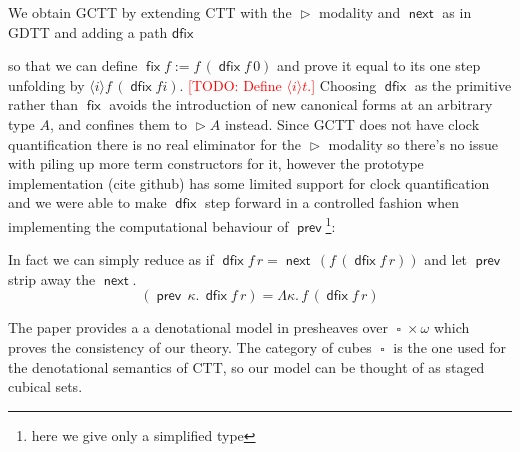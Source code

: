 \documentclass{book}
\newcommand{\TODO}[1]{\textcolor{red}{[TODO: #1]}}
\DeclareMathOperator{\fix}{\mathsf{fix}}
\DeclareMathOperator{\Later}{\vartriangleright}
\DeclareMathOperator{\dfix}{\mathsf{dfix}}
\DeclareMathOperator{\prev}{\mathsf{prev}}
\DeclareMathOperator{\next}{\ensuremath{\mathsf{next}}}
\DeclareMathOperator{\Cube}{\square}
\newcommand{\sd}{.\,}
\begin{document}
  We obtain GCTT by extending CTT with the $\Later$ modality and $\next$ as in GDTT and adding a path $\mathsf{dfix}$
  so that we can define $\fix f := f\,(\dfix f\,0)$ and prove it
  equal to its one step unfolding by $\langle i \rangle f\,(\dfix f i)$.
  \TODO{Define $\langle i \rangle t$.}
  Choosing $\dfix$ as the primitive rather than $\fix$ avoids the
  introduction of new canonical forms at an arbitrary type $A$, and
  confines them to $\Later A$ instead.
  Since GCTT does not have clock quantification there is no real
  eliminator for the $\Later$ modality so there's no issue with piling
  up more term constructors for it, however the prototype
  implementation (cite github) has some limited support for clock
  quantification and we were able to make $\dfix$ step forward in a
  controlled fashion when implementing the computational behaviour of
  $\prev$\footnote{here we give only a simplified type}:
  In fact we can simply reduce as if $\dfix f\,r = \next\,(f\,(\dfix f\,r))$ and let $\prev$ strip away the $\next$.
  \[
    (\prev\,\kappa\sd \dfix f\,r) = \Lambda \kappa\sd f\,(\dfix f\,r)
  \]

  The paper provides a a denotational model in presheaves over $\Cube
  \times \omega$ which proves the consistency of our theory.
  The category of cubes $\Cube$ is the one used for the denotational
  semantics of CTT, so our model can be thought of as staged cubical sets.
\end{document}
